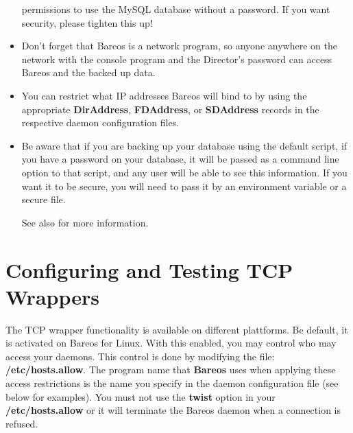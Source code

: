 \begin{itemize}
   permissions to use the MySQL database without a  password. If you want
   security, please tighten this up!
\item Don't forget that Bareos is a network program, so anyone anywhere  on
   the network with the console program and the Director's password  can access
   Bareos and the backed up data.
\item You can restrict what IP addresses Bareos will bind to by using the
   appropriate {\bf DirAddress}, {\bf FDAddress}, or {\bf SDAddress}  records in
   the respective daemon configuration files.
\item Be aware that if you are backing up your database using the default
   script, if you have a password on your database, it will be passed as
   a command line option to that script, and any user will be able to see
   this information. If you want it to be secure, you will need to pass it
   by an environment variable or a secure file.

   See also 
   for more information.
\end{itemize}



\label{wrappers}
\section{Configuring and Testing TCP Wrappers}

The TCP wrapper functionality is available on different plattforms.
Be default, it is activated on Bareos for Linux.
With this enabled, you may control who may access your
daemons.  This control is done by modifying the file: {\bf
/etc/hosts.allow}.  The program name that {\bf Bareos} uses when
applying these access restrictions is the name you specify in the
daemon configuration file (see below for examples).
You must not use the {\bf twist} option in your {\bf
/etc/hosts.allow} or it will terminate the Bareos daemon when a
connection is refused.

